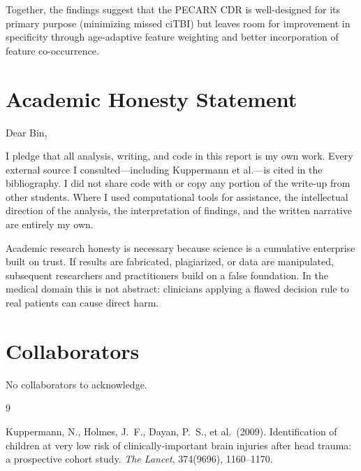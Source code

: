 \documentclass[10pt,letterpaper]{article}
\begin{document}
Together, the findings suggest that the PECARN CDR is well-designed for its primary purpose
(minimizing missed ciTBI) but leaves room for improvement in specificity through age-adaptive
feature weighting and better incorporation of feature co-occurrence.

\section{Academic Honesty Statement}
\label{honesty}

Dear Bin,

I pledge that all analysis, writing, and code in this report is my own work.
Every external source I consulted---including Kuppermann et al.---is cited in the bibliography.
I did not share code with or copy any portion of the write-up from other students.
Where I used computational tools for assistance, the intellectual direction of the analysis,
the interpretation of findings, and the written narrative are entirely my own.

Academic research honesty is necessary because science is a cumulative enterprise built on trust.
If results are fabricated, plagiarized, or data are manipulated, subsequent researchers and
practitioners build on a false foundation.
In the medical domain this is not abstract: clinicians applying a flawed decision rule to real
patients can cause direct harm.

\section{Collaborators}
\label{collaborators}

No collaborators to acknowledge.

\begin{thebibliography}{9}

Kuppermann, N., Holmes, J.~F., Dayan, P.~S., et al.\ (2009).
Identification of children at very low risk of clinically-important brain injuries after head
trauma: a prospective cohort study.
\textit{The Lancet}, 374(9696), 1160--1170.

\end{thebibliography}
\end{document}
